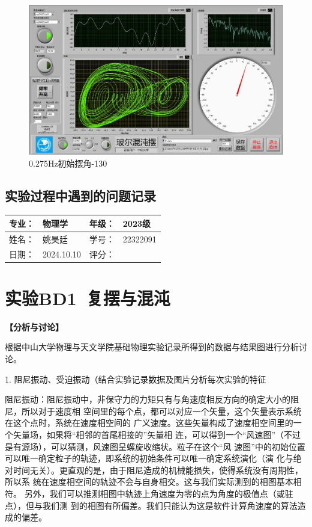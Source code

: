 \documentclass[dvipsnames, svgnames,a4paper,11pt]{article}
\begin{document}
\begin{figure}[H]
	\includegraphics[width=\textwidth]{姚昊廷22322091/0.275Hz-130.jpg}
	\caption{0.275Hz初始摆角-130}
\end{figure}
\subsection{实验过程中遇到的问题记录}



\clearpage
{}
\begin{table}
	\renewcommand\arraystretch{1.7}
	\begin{tabularx}{\textwidth}{|X|X|X|X|}
	\hline
	专业：& 物理学 &年级：& 2023级\\
	\hline
	姓名： &姚昊廷 & 学号：& 22322091\\
	\hline
    日期：&2024.10.10 & 评分： &\\
	\hline
	\end{tabularx}
\end{table}

\section{实验BD1\ 复摆与混沌}
\textbf{【分析与讨论】}

根据中山大学物理与天文学院基础物理实验记录所得到的数据与结果图进行分析讨论。

1. 阻尼振动、受迫振动（结合实验记录数据及图片分析每次实验的特征

阻尼振动：阻尼振动中，非保守力的力矩只有与角速度相反方向的确定大小的阻尼，所以对于速度相
空间里的每个点，都可以对应一个矢量，这个矢量表示系统在这个点时，系统在速度相空间的
广义速度。这些矢量构成了速度相空间里的一个矢量场，如果将“相邻的首尾相接的”矢量相
连，可以得到一个“风速图”（不过是有源场），可以猜测，风速图呈螺旋收缩状。粒子在这个“风
速图”中的初始位置可以唯一确定粒子的轨迹，即系统的初始条件可以唯一确定系统演化（演
化与绝对时间无关）。更直观的是，由于阻尼造成的机械能损失，使得系统没有周期性，所以系
统在速度相空间的轨迹不会与自身相交。这与我们实际测到的相图基本相符。
另外，我们可以推测相图中轨迹上角速度为零的点为角度的极值点（或驻点），但与我们测
到的相图有所偏差。我们只能认为这是软件计算角速度的算法造成的偏差。
\end{document}
